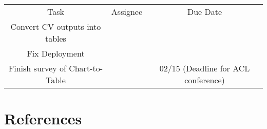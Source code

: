\documentclass[
	letterpaper, %
]{jdf}
\begin{document}
            \begin{table}
                 \begin{tabular}{|c|c|c|}
                     Task & Assignee & Due Date \\
                     Convert CV outputs into tables & & \\
                     Fix Deployment & & \\
                     Finish survey of Chart-to-Table & & 02/15 (Deadline for ACL conference) \\
                 \end{tabular}
                 \caption{}
                 \label{}
                  \end{table}

\section{References}
\printbibliography[heading=none]
\end{document}
